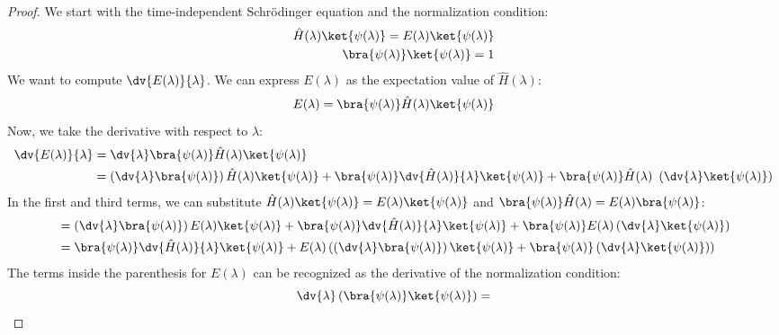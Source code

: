 \begin{proof}
  We start with the time-independent Schrödinger equation and the
  normalization condition:
  \begin{align} \label{eq:schrodinger_normalization}
    \hat H(\lambda)\ket{\psi(\lambda)} = E(\lambda)\ket{\psi(\lambda)} \\
    \bra{\psi(\lambda)}\ket{\psi(\lambda)} = 1 \notag
  \end{align}
  We want to compute $\dv{E(\lambda)}{\lambda}$. We can express
  $E(\lambda)$ as the expectation value of $\hat H(\lambda)$:
  \begin{equation}
    E(\lambda) = \bra{\psi(\lambda)}\hat H(\lambda)\ket{\psi(\lambda)}
  \end{equation}
  Now, we take the derivative with respect to $\lambda$:
  \begin{align} \label{eq:feynman_hellman_derivation_step1}
    \dv{E(\lambda)}{\lambda} &=
    \dv{\lambda}\bra{\psi(\lambda)}\hat H(\lambda)\ket{\psi(\lambda)} \\
    &= \left(\dv{\lambda} \bra{\psi(\lambda)}\right)\hat
    H(\lambda)\ket{\psi(\lambda)} + \bra{\psi(\lambda)} \dv{\hat
    H(\lambda)}{\lambda} \ket{\psi(\lambda)} +
    \bra{\psi(\lambda)}\hat H(\lambda)\ \left(\dv{\lambda}
    \ket{\psi(\lambda)}\right) \notag
  \end{align}
  In the first and third terms, we can substitute $\hat
  H(\lambda)\ket{\psi(\lambda)} = E(\lambda)\ket{\psi(\lambda)}$
  and $\bra{\psi(\lambda)}\hat H(\lambda) = E(\lambda)\bra{\psi(\lambda)}$:
  \begin{align} \label{eq:feynman_hellman_derivation_step2}
    &= \left(\dv{\lambda} \bra{\psi(\lambda)}\right) E(\lambda)
    \ket{\psi(\lambda)} + \bra{\psi(\lambda)} \dv{\hat
    H(\lambda)}{\lambda} \ket{\psi(\lambda)} +
    \bra{\psi(\lambda)} E(\lambda) \left(\dv{\lambda}
    \ket{\psi(\lambda)}\right) \\
    &= \bra{\psi(\lambda)} \dv{\hat H(\lambda)}{\lambda}
    \ket{\psi(\lambda)} + E(\lambda) \left(\left(\dv{\lambda}
      \bra{\psi(\lambda)}\right) \ket{\psi(\lambda)} +
      \bra{\psi(\lambda)} \left(\dv{\lambda}
    \ket{\psi(\lambda)}\right) \right) \notag
  \end{align}
  The terms inside the parenthesis for $E(\lambda)$ can be
  recognized as the derivative of the normalization condition:
  \begin{equation} \label{eq:feynman_hellman_normalization_deriv}
    \dv{\lambda}
    \left(\bra{\psi(\lambda)}\ket{\psi(\lambda)}\right) =

\end{equation}
\end{proof}
